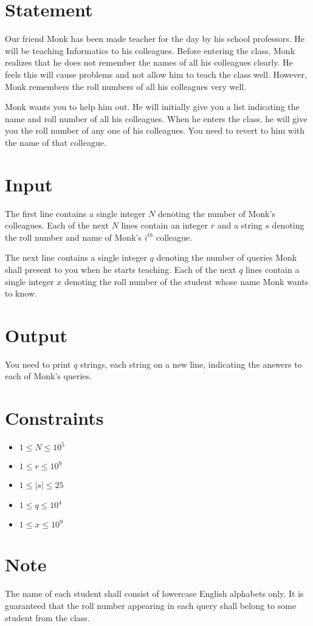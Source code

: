\documentclass{article}
\begin{document}
\section*{Statement}

Our friend Monk has been made teacher for the day by his school professors. He will be teaching Informatics to his colleagues. Before entering the class, Monk realizes that he does not remember the names of all his colleagues clearly. He feels this will cause problems and not allow him to teach the class well. However, Monk remembers the roll numbers of all his colleagues very well.

Monk wants you to help him out. He will initially give you a list indicating the name and roll number of all his colleagues. When he enters the class, he will give you the roll number of any one of his colleagues. You need to revert to him with the name of that colleague.

\section*{Input}

The first line contains a single integer $N$ denoting the number of Monk's colleagues. Each of the next $N$ lines contain an integer $r$ and a string $s$ denoting the roll number and name of Monk's $i^{th}$ colleague.

The next line contains a single integer $q$ denoting the number of queries Monk shall present to you when he starts teaching. Each of the next $q$ lines contain a single integer $x$ denoting the roll number of the student whose name Monk wants to know.

\section*{Output}

You need to print $q$ strings, each string on a new line, indicating the answers to each of Monk's queries. 

\section*{Constraints}

\begin{itemize}
    \item $1 \le N \le 10^{5}$
    \item $1 \le r \le 10^{9}$
    \item $1 \le |s| \le 25$
    \item $1 \le q \le 10^{4}$
    \item $1 \le x \le 10^{9}$
\end{itemize}

\section*{Note}

The name of each student shall consist of lowercase English alphabets only. It is guaranteed that the roll number appearing in each query shall belong to some student from the class.
\end{document}
